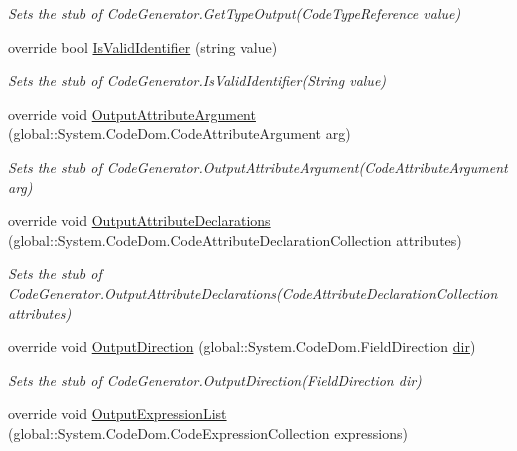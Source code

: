 \begin{DoxyCompactItemize}
\begin{DoxyCompactList}\small\item\em Sets the stub of Code\-Generator.\-Get\-Type\-Output(\-Code\-Type\-Reference value)\end{DoxyCompactList}\item 
override bool \hyperlink{class_system_1_1_code_dom_1_1_compiler_1_1_fakes_1_1_stub_code_generator_a3e251152cc0965b54a29e57fd2e4d18a}{Is\-Valid\-Identifier} (string value)
\begin{DoxyCompactList}\small\item\em Sets the stub of Code\-Generator.\-Is\-Valid\-Identifier(\-String value)\end{DoxyCompactList}\item 
override void \hyperlink{class_system_1_1_code_dom_1_1_compiler_1_1_fakes_1_1_stub_code_generator_ae3fe9d4e501b49c1cdf40f6ed927577b}{Output\-Attribute\-Argument} (global\-::\-System.\-Code\-Dom.\-Code\-Attribute\-Argument arg)
\begin{DoxyCompactList}\small\item\em Sets the stub of Code\-Generator.\-Output\-Attribute\-Argument(\-Code\-Attribute\-Argument arg)\end{DoxyCompactList}\item 
override void \hyperlink{class_system_1_1_code_dom_1_1_compiler_1_1_fakes_1_1_stub_code_generator_a9cf86b0ee821a1f66aab20e0b68744e6}{Output\-Attribute\-Declarations} (global\-::\-System.\-Code\-Dom.\-Code\-Attribute\-Declaration\-Collection attributes)
\begin{DoxyCompactList}\small\item\em Sets the stub of Code\-Generator.\-Output\-Attribute\-Declarations(\-Code\-Attribute\-Declaration\-Collection attributes)\end{DoxyCompactList}\item 
override void \hyperlink{class_system_1_1_code_dom_1_1_compiler_1_1_fakes_1_1_stub_code_generator_a2bb9a7b93f97dac15d51b75c6156ae4f}{Output\-Direction} (global\-::\-System.\-Code\-Dom.\-Field\-Direction \hyperlink{jquery-1_810_82-vsdoc_8js_a49baab980d9b27347df35195d88ef25f}{dir})
\begin{DoxyCompactList}\small\item\em Sets the stub of Code\-Generator.\-Output\-Direction(\-Field\-Direction dir)\end{DoxyCompactList}\item 
override void \hyperlink{class_system_1_1_code_dom_1_1_compiler_1_1_fakes_1_1_stub_code_generator_a6a8fcea661726b1c279e4f42ea95693d}{Output\-Expression\-List} (global\-::\-System.\-Code\-Dom.\-Code\-Expression\-Collection expressions)

\end{DoxyCompactItemize}
